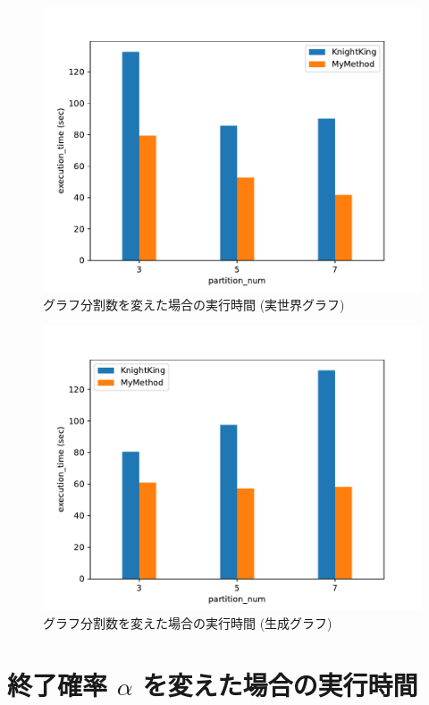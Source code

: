 \begin{figure}[t]
    \centering
    \includegraphics[scale=0.8]{figure/Kn_vs_AR_partition_num_LiveJournal.pdf}
    \caption{グラフ分割数を変えた場合の実行時間 (実世界グラフ)}
    \label{グラフ分割数を変えた場合の実行時間 (実世界グラフ)}
\end{figure}

\begin{figure}[t!]
    \centering
    \includegraphics[scale=0.8]{figure/Kn_vs_AR_partition_num_SBM_3.pdf}
    \caption{グラフ分割数を変えた場合の実行時間 (生成グラフ)}
    \label{グラフ分割数を変えた場合の実行時間 (生成グラフ)}
\end{figure}

\section{終了確率 $\alpha$ を変えた場合の実行時間}\label{終了確率 alpha を変えた場合の実行時間}

